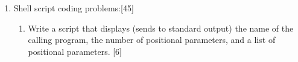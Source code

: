 \documentclass{article}
\newcommand{\answer}[1]{\ifthenelse{\boolean{KEY}}{#1}{}}
\begin{document}
\begin{enumerate}
\newpage
%
%
%
%
%
%
%
%
%
%


\item Shell script coding problems:[45]
\begin{enumerate} 
\item Write a script that displays (sends to standard output) the name
of the calling program, the number of positional parameters, and a list of
positional parameters. [6]
\vspace{3in}




\end{enumerate}
\end{enumerate}
\end{document}
